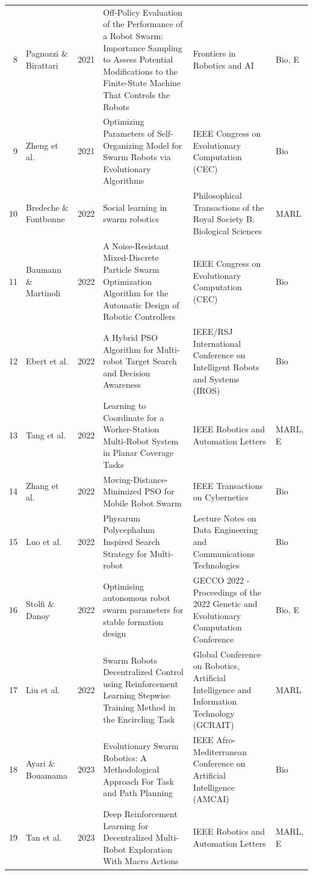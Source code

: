 \begin{longtable}{@{}r>{\raggedright\arraybackslash}p{2.3cm}r>{\raggedright\arraybackslash}p{5.4cm}>{\raggedright\arraybackslash}p{3.0cm}p{1.4cm}@{}}
8 & Pagnozzi \& Birattari & 2021 & Off-Policy Evaluation of the Performance of a Robot Swarm: Importance Sampling to Assess Potential Modifications to the Finite-State Machine That Controls the Robots & Frontiers in Robotics and AI & Bio, E \\
9 & Zheng et al. & 2021 & Optimizing Parameters of Self-Organizing Model for Swarm Robots via Evolutionary Algorithms & 2021 IEEE Congress on Evolutionary Computation (CEC) & Bio \\
10 & Bredeche \& Fontbonne & 2022 & Social learning in swarm robotics & Philosophical Transactions of the Royal Society B: Biological Sciences & MARL \\
11 & Baumann \& Martinoli & 2022 & A Noise-Resistant Mixed-Discrete Particle Swarm Optimization Algorithm for the Automatic Design of Robotic Controllers & 2022 IEEE Congress on Evolutionary Computation (CEC) & Bio \\
12 & Ebert et al. & 2022 & A Hybrid PSO Algorithm for Multi-robot Target Search and Decision Awareness & 2022 IEEE/RSJ International Conference on Intelligent Robots and Systems (IROS) & Bio \\
13 & Tang et al. & 2022 & Learning to Coordinate for a Worker-Station Multi-Robot System in Planar Coverage Tasks & IEEE Robotics and Automation Letters & MARL, E \\
14 & Zhang et al. & 2022 & Moving-Distance-Minimized PSO for Mobile Robot Swarm & IEEE Transactions on Cybernetics & Bio \\
15 & Luo et al. & 2022 & Physarum Polycephalum Inspired Search Strategy for Multi-robot & Lecture Notes on Data Engineering and Communications Technologies & Bio \\
16 & Stolfi \& Danoy & 2022 & Optimising autonomous robot swarm parameters for stable formation design & GECCO 2022 - Proceedings of the 2022 Genetic and Evolutionary Computation Conference & Bio, E \\
17 & Liu et al. & 2022 & Swarm Robots Decentralized Control using Reinforcement Learning Stepwise Training Method in the Encircling Task & 2022 Global Conference on Robotics, Artificial Intelligence and Information Technology (GCRAIT) & MARL \\
18 & Ayari \& Bouamama & 2023 & Evolutionary Swarm Robotics: A Methodological Approach For Task and Path Planning & 2023 IEEE Afro-Mediterranean Conference on Artificial Intelligence (AMCAI) & Bio \\
19 & Tan et al. & 2023 & Deep Reinforcement Learning for Decentralized Multi-Robot Exploration With Macro Actions & IEEE Robotics and Automation Letters & MARL, E \\

\end{longtable}
